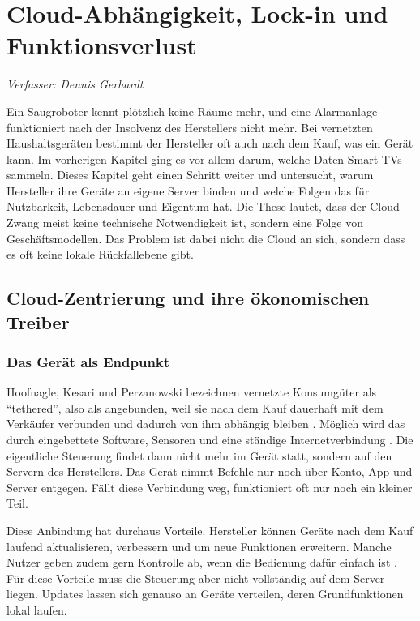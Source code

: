 \chapter{Cloud-Abhängigkeit, Lock-in und Funktionsverlust}\label{chap:cloud}
\noindent\textit{Verfasser: Dennis Gerhardt}
\medskip

Ein Saugroboter kennt plötzlich keine Räume mehr, und eine Alarmanlage funktioniert nach der Insolvenz des Herstellers nicht mehr. Bei vernetzten Haushaltsgeräten bestimmt der Hersteller oft auch nach dem Kauf, was ein Gerät
kann. Im vorherigen Kapitel ging es vor allem darum, welche Daten Smart-TVs
sammeln. Dieses Kapitel geht einen Schritt weiter und untersucht, warum
Hersteller ihre Geräte an eigene Server binden und welche Folgen das für
Nutzbarkeit, Lebensdauer und Eigentum hat. Die These lautet, dass der Cloud-Zwang meist keine technische Notwendigkeit ist, sondern eine Folge von Geschäftsmodellen.
Das Problem ist dabei nicht die Cloud an sich, sondern dass es oft keine lokale
Rückfallebene gibt.

\section{Cloud-Zentrierung und ihre ökonomischen Treiber}\label{sec:cloud-treiber}

\subsection{Das Gerät als Endpunkt}\label{sec:cloud-endpunkt}

Hoofnagle, Kesari und Perzanowski bezeichnen vernetzte Konsumgüter als
\enquote{tethered}, also als angebunden, weil sie nach dem Kauf dauerhaft mit dem Verkäufer verbunden und dadurch von ihm abhängig bleiben
\cite[S.~785]{hoofnagle:2019}. Möglich wird das durch eingebettete Software,
Sensoren und eine ständige Internetverbindung \cite[S.~789--792]{hoofnagle:2019}.
Die eigentliche Steuerung findet dann nicht mehr im Gerät statt, sondern auf
den Servern des Herstellers. Das Gerät nimmt Befehle nur noch über Konto, App
und Server entgegen. Fällt diese Verbindung weg, funktioniert oft nur noch ein
kleiner Teil.

Diese Anbindung hat durchaus Vorteile. Hersteller können Geräte nach dem Kauf
laufend aktualisieren, verbessern und um neue Funktionen erweitern. Manche
Nutzer geben zudem gern Kontrolle ab, wenn die Bedienung dafür einfach ist
\cite[S.~804\,f., 808]{hoofnagle:2019}. Für diese Vorteile muss die Steuerung
aber nicht vollständig auf dem Server liegen. Updates lassen sich genauso an
Geräte verteilen, deren Grundfunktionen lokal laufen.

